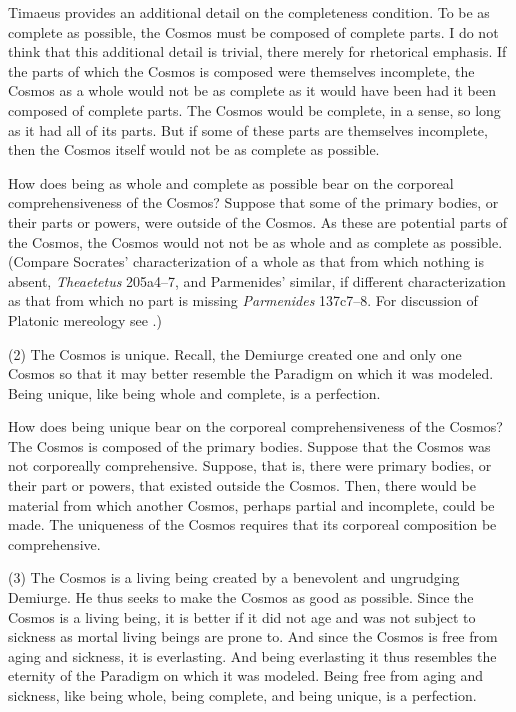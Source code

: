 Timaeus provides an additional detail on the completeness condition. To be as complete as possible, the Cosmos must be composed of complete parts. I do not think that this additional detail is trivial, there merely for rhetorical emphasis. If the parts of which the Cosmos is composed were themselves incomplete, the Cosmos as a whole would not be as complete as it would have been had it been composed of complete parts. The Cosmos would be complete, in a sense, so long as it had all of its parts. But if some of these parts are themselves incomplete, then the Cosmos itself would not be as complete as possible.

How does being as whole and complete as possible bear on the corporeal comprehensiveness of the Cosmos? Suppose that some of the primary bodies, or their parts or powers, were outside of the Cosmos. As these are potential parts of the Cosmos, the Cosmos would not not be as whole and as complete as possible. (Compare Socrates' characterization of a whole as that from which nothing is absent, \emph{Theaetetus} 205a4--7, and Parmenides' similar, if different characterization as that from which no part is missing \emph{Parmenides} 137c7--8. For discussion of Platonic mereology see \citealt{Harte:2002tl}.)

(2) The Cosmos is unique. Recall, the Demiurge created one and only one Cosmos so that it may better resemble the Paradigm on which it was modeled. Being unique, like being whole and complete, is a perfection.

How does being unique bear on the corporeal comprehensiveness of the Cosmos? The Cosmos is composed of the primary bodies. Suppose that the Cosmos was not corporeally comprehensive. Suppose, that is, there were primary bodies, or their part or powers, that existed outside the Cosmos. Then, there would be material from which another Cosmos, perhaps partial and incomplete, could be made. The uniqueness of the Cosmos requires that its corporeal composition be comprehensive.

(3) The Cosmos is a living being created by a benevolent and ungrudging Demiurge. He thus seeks to make the Cosmos as good as possible. Since the Cosmos is a living being, it is better if it did not age and was not subject to sickness as mortal living beings are prone to. And since the Cosmos is free from aging and sickness, it is everlasting. And being everlasting it thus resembles the eternity of the Paradigm on which it was modeled. Being free from aging and sickness, like being whole, being complete, and being unique, is a perfection.

